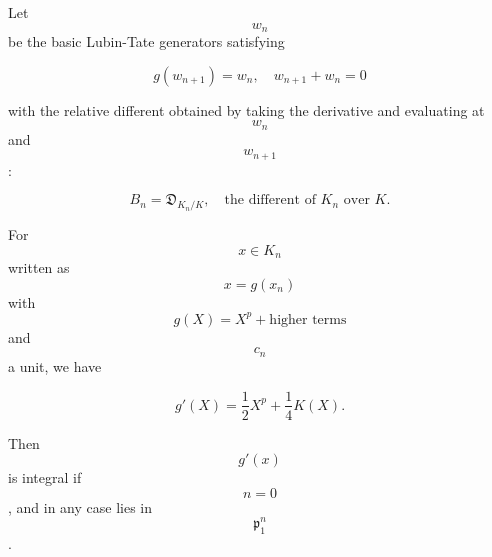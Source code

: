 Let $$w_n$$ be the basic Lubin-Tate generators satisfying

$$g(w_{n+1}) = w_n, \quad w_{n+1} + w_n = 0$$

with the relative different obtained by taking the derivative and evaluating at $$w_n$$ and $$w_{n+1}$$:

$$B_n = \mathfrak{D}_{K_n/K}, \quad \text{the different of } K_n \text{ over } K.$$

For $$x \in K_n$$ written as $$x = g(x_n)$$ with $$g(X) = X^p + \text{higher terms}$$ and $$c_n$$ a unit, we have

$$g'(X) = \frac{1}{2} X^p + \frac{1}{4} K(X).$$

Then $$g'(x)$$ is integral if $$n = 0$$, and in any case lies in $$\mathfrak{p}_1^n$$.
